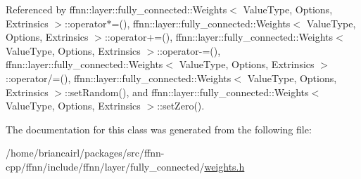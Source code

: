 Referenced by ffnn\-::layer\-::fully\-\_\-connected\-::\-Weights$<$ Value\-Type, Options, Extrinsics $>$\-::operator$\ast$=(), ffnn\-::layer\-::fully\-\_\-connected\-::\-Weights$<$ Value\-Type, Options, Extrinsics $>$\-::operator+=(), ffnn\-::layer\-::fully\-\_\-connected\-::\-Weights$<$ Value\-Type, Options, Extrinsics $>$\-::operator-\/=(), ffnn\-::layer\-::fully\-\_\-connected\-::\-Weights$<$ Value\-Type, Options, Extrinsics $>$\-::operator/=(), ffnn\-::layer\-::fully\-\_\-connected\-::\-Weights$<$ Value\-Type, Options, Extrinsics $>$\-::set\-Random(), and ffnn\-::layer\-::fully\-\_\-connected\-::\-Weights$<$ Value\-Type, Options, Extrinsics $>$\-::set\-Zero().



The documentation for this class was generated from the following file\-:\begin{DoxyCompactItemize}
\item 
/home/briancairl/packages/src/ffnn-\/cpp/ffnn/include/ffnn/layer/fully\-\_\-connected/\hyperlink{weights_8h}{weights.\-h}\end{DoxyCompactItemize}
